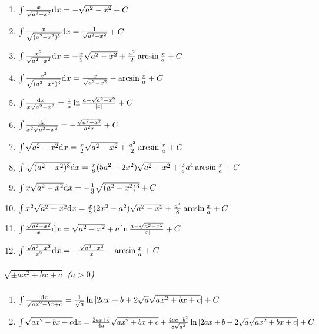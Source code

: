\begin{tiny}
\begin{enumerate}
\item $ \int \frac{x}{\sqrt{a^2-x^2}} \mathrm{d} x = -\sqrt{a^2-x^2} + C $

\item $ \int \frac{x}{\sqrt{(a^2-x^2)^3}} \mathrm{d} x = \frac{1}{\sqrt{a^2-x^2}} + C $

\item $ \int \frac{x^2}{\sqrt{a^2-x^2}} \mathrm{d} x = -\frac{x}{2}\sqrt{a^2-x^2} + \frac{a^2}{2}\arcsin\frac{x}{a} + C $

\item $ \int \frac{x^2}{\sqrt{(a^2-x^2)^3}} \mathrm{d} x = \frac{x}{\sqrt{a^2-x^2}} - \arcsin\frac{x}{a} + C $

\item $ \int \frac{\mathrm{d} x}{x\sqrt{a^2-x^2}} = \frac{1}{a}\ln\frac{a-\sqrt{a^2-x^2}}{|x|} + C$

\item $ \int \frac{\mathrm{d} x}{x^2\sqrt{a^2-x^2}} = -\frac{\sqrt{a^2-x^2}}{a^2x} + C $

\item $ \int \sqrt{a^2-x^2}\mathrm{d} x = \frac{x}{2}\sqrt{a^2-x^2} + \frac{a^2}{2}\arcsin\frac{x}{a} + C $

\item $ \int \sqrt{(a^2-x^2)^3}\mathrm{d} x = \frac{x}{8}(5a^2-2x^2)\sqrt{a^2-x^2}+\frac{3}{8}a^4\arcsin\frac{x}{a} + C $

\item $ \int x\sqrt{a^2-x^2}\mathrm{d} x = -\frac{1}{3}\sqrt{(a^2-x^2)^3} + C $

\item $ \int x^2\sqrt{a^2-x^2}\mathrm{d} x = \frac{x}{8}(2x^2-a^2)\sqrt{a^2-x^2}+\frac{a^4}{8}\arcsin\frac{x}{a} + C $

\item $ \int \frac{\sqrt{a^2-x^2}}{x}\mathrm{d} x = \sqrt{a^2-x^2} + a \ln \frac{a-\sqrt{a^2-x^2}}{|x|} + C $

\item $ \int \frac{\sqrt{a^2-x^2}}{x^2} \mathrm{d} x = -\frac{\sqrt{a^2-x^2}}{x} - \arcsin\frac{x}{a} + C $

\end{enumerate}

\subparagraph{$\sqrt{\pm ax^2+bx+c}$ ($a>0$)}

\begin{enumerate}

\item $ \int \frac{\mathrm{d} x}{\sqrt{ax^2+bx+c}} = \frac{1}{\sqrt{a}} \ln | 2ax+b+2\sqrt{a}\sqrt{ax^2+bx+c} | + C $

\item $ \int \sqrt{ax^2+bx+c} \mathrm{d} x = \frac{2ax+b}{4a}\sqrt{ax^2+bx+c} +
	\frac{4ac-b^2}{8\sqrt{a^3}}\ln |2ax+b+2\sqrt{a}\sqrt{ax^2+bx+c}| + C $


\end{enumerate}
\end{tiny}
